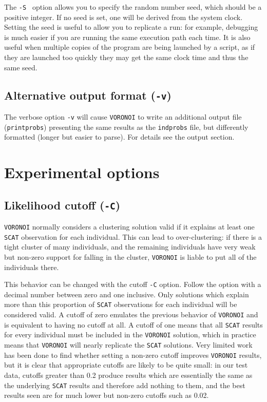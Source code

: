 \documentclass[10pt,titlepage,times,letterpaper]{article}
\def\SCAT{{\tt SCAT} }
\def\VORONOI{{\tt VORONOI} }
\begin{document}
The {\tt -S } option allows you to specify the random number seed, which should be a
positive integer.  If no seed is set, one will be derived from the system clock.
Setting the seed is useful to allow you to replicate a run:  for example, debugging is
much easier if you are running the same execution path each time.
It is also useful when multiple copies of the program are being launched by a script,
as if they are launched too quickly they may get the same clock time and thus the same seed.

\subsection{Alternative output format  ({\tt -v})}

The verbose option {\tt -v} will cause \VORONOI to write an additional output
file ({\tt printprobs}) presenting the same results as the {\tt indprobs} file, but differently formatted (longer
but easier to parse).  For details see the output section.

\section{Experimental options}

\subsection{Likelihood cutoff ({\tt -C})}

\VORONOI normally considers a clustering solution valid if it explains at least
one \SCAT observation for each individual.  This can lead to over-clustering:  if there
is a tight cluster of many individuals, and the remaining individuals have very weak but
non-zero support for falling in the cluster, \VORONOI is liable to put all of the individuals
there.

This behavior can be changed with the cutoff {\tt -C} option.  Follow the option with
a decimal number between zero and one inclusive.  Only solutions which explain more
than this proportion of \SCAT observations for each individual will be considered valid.  
A cutoff
of zero emulates the previous behavior of \VORONOI and is equivalent to having no
cutoff at all.  A cutoff of one means that all \SCAT results for every individual must
be included in the \VORONOI solution, which in practice means that \VORONOI will nearly
replicate the \SCAT solutions.  Very limited
work has been done to find whether setting a non-zero cutoff improves \VORONOI results,
but it is clear that appropriate cutoffs are likely to be quite small:  in our test
data, cutoffs greater than 0.2 produce results which are essentially the same as 
the underlying \SCAT results and therefore add nothing to them, and the best results 
seen are for much lower but non-zero cutoffs such as 0.02.
\end{document}
